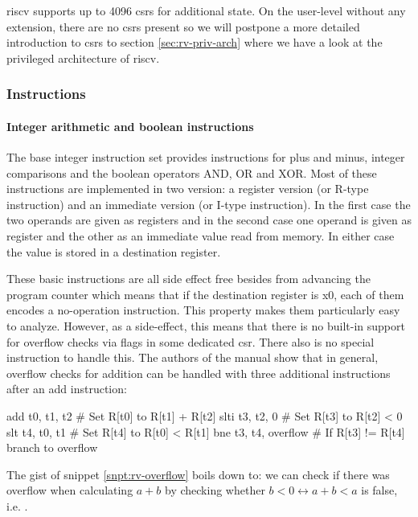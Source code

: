 \gls{riscv} supports up to 4096 \glspl{csr} for additional state.
On the user-level without any extension, there are no \glspl{csr} present so we will postpone a more detailed introduction to \glspl{csr} to section \ref{sec:rv-priv-arch} where we have a look at the privileged architecture of \gls{riscv}.

\subsubsection{Instructions}

\paragraph{Integer arithmetic and boolean instructions}
The base integer instruction set provides instructions for plus and minus, integer comparisons and the boolean operators AND, OR and XOR.
Most of these instructions are implemented in two version: a register version (or R-type instruction) and an immediate version (or I-type instruction).
In the first case the two operands are given as registers and in the second case one operand is given as register and the other as an immediate value read from memory.
In either case the value is stored in a destination register.

These basic instructions are all side effect free besides from advancing the program counter which means that if the destination register is x0, each of them encodes a no-operation instruction.
This property makes them particularly easy to analyze.
However, as a side-effect, this means that there is no built-in support for overflow checks via flags in some dedicated \gls{csr}.
There also is no special instruction to handle this.
The authors of the manual show that in general, overflow checks for addition can be handled with three additional instructions after an add instruction:

\begin{assmblr}[caption={General overflow checking \cite{RiscVISA}},label={snpt:rv-overflow}]
add  t0, t1, t2          # Set R[t0] to R[t1] + R[t2]
slti t3, t2, 0           # Set R[t3] to R[t2] < 0
slt  t4, t0, t1          # Set R[t4] to R[t0] < R[t1]
bne  t3, t4, overflow    # If R[t3] != R[t4] branch to overflow
\end{assmblr}

The gist of snippet \ref{snpt:rv-overflow} boils down to: we can check if there was overflow when calculating $ a + b $ by checking whether $ b < 0 \leftrightarrow a + b < a $ is false, i.e. .

